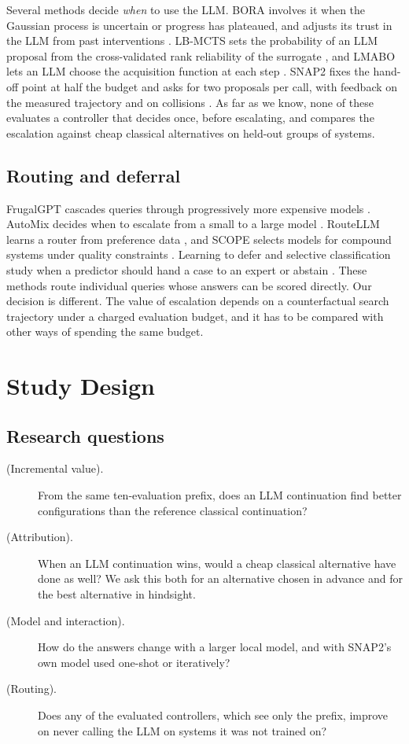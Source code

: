 Several methods decide \emph{when} to use the LLM. BORA involves it when the Gaussian process is uncertain or progress has plateaued, and adjusts its trust in the LLM from past interventions \cite{cisse2025bora}. LB-MCTS sets the probability of an LLM proposal from the cross-validated rank reliability of the surrogate \cite{xu2026lbmcts}, and LMABO lets an LLM choose the acquisition function at each step \cite{ngo2026lmabo}. SNAP2 fixes the hand-off point at half the budget and asks for two proposals per call, with feedback on the measured trajectory and on collisions \cite{srinivasan2026snap2}. As far as we know, none of these evaluates a controller that decides once, before escalating, and compares the escalation against cheap classical alternatives on held-out groups of systems.

\subsection{Routing and deferral}

FrugalGPT cascades queries through progressively more expensive models \cite{chen2023frugalgpt}. AutoMix decides when to escalate from a small to a large model \cite{aggarwal2023automix}. RouteLLM learns a router from preference data \cite{ong2024routellm}, and SCOPE selects models for compound systems under quality constraints \cite{huang2026scope}. Learning to defer and selective classification study when a predictor should hand a case to an expert or abstain \cite{mozannar2020defer,geifman2017selective}. These methods route individual queries whose answers can be scored directly. Our decision is different. The value of escalation depends on a counterfactual search trajectory under a charged evaluation budget, and it has to be compared with other ways of spending the same budget.

\section{Study Design}

\subsection{Research questions}

\begin{description}
  \item[ (Incremental value).] From the same ten-evaluation prefix, does an LLM continuation find better configurations than the reference classical continuation?
  \item[ (Attribution).] When an LLM continuation wins, would a cheap classical alternative have done as well? We ask this both for an alternative chosen in advance and for the best alternative in hindsight.
  \item[ (Model and interaction).] How do the answers change with a larger local model, and with SNAP2's own model used one-shot or iteratively?
  \item[ (Routing).] Does any of the evaluated controllers, which see only the prefix, improve on never calling the LLM on systems it was not trained on?
\end{description}

